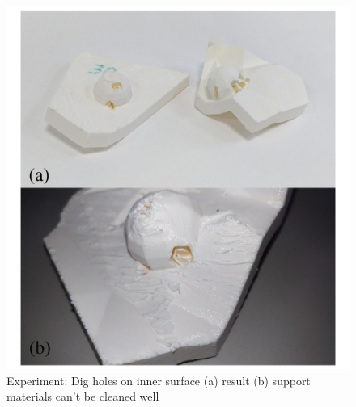 \begin{figure}[ht]
\centering
\includegraphics[width=1.0\linewidth]{figs/dig_hole.pdf} 
\caption{
Experiment: Dig holes on inner surface (a) result (b)  support materials can't be cleaned well}
\label{fig:exp_surface_dig}
\end{figure}

